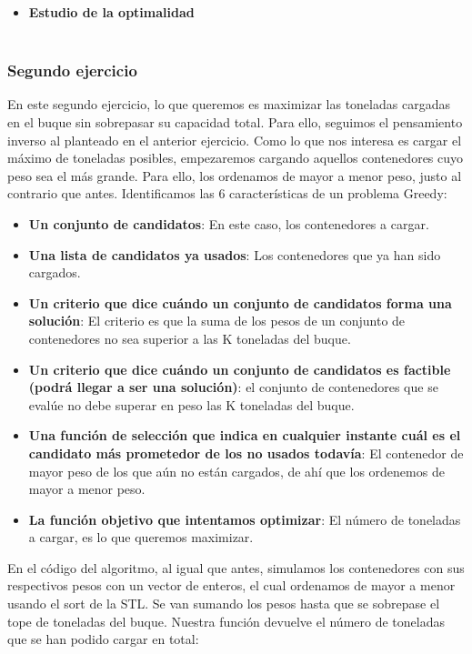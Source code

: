 \documentclass[10pt,a4paper]{article}
\begin{document}
	
	
	\begin{itemize}
		\item \textbf{Estudio de la optimalidad}
		\\
		\\
	\end{itemize}
	
\subsubsection{Segundo ejercicio}

	En este segundo ejercicio, lo que queremos es maximizar las toneladas cargadas en el buque sin sobrepasar su capacidad total. Para ello, seguimos el pensamiento inverso al planteado en el anterior ejercicio. Como lo que nos interesa es cargar el máximo de toneladas posibles, empezaremos cargando aquellos contenedores cuyo peso sea el más grande. Para ello, los ordenamos de mayor a menor peso, justo al contrario que antes. Identificamos las 6 características de un problema Greedy:
	
	\begin{itemize}
		\item \textbf{Un conjunto de candidatos}: En este caso, los contenedores a cargar.
		\item \textbf{Una lista de candidatos ya usados}: Los contenedores que ya han sido cargados.
		\item \textbf{Un criterio que dice cuándo un conjunto de candidatos forma una solución}: El criterio es que la suma de los pesos de un conjunto de contenedores no sea superior a las K toneladas del buque.
		\item \textbf{Un criterio que dice cuándo un conjunto de candidatos es factible (podrá llegar a ser una solución)}: el conjunto de contenedores que se evalúe no debe superar en peso las K toneladas del buque.
		\item \textbf{Una función de selección que indica en cualquier instante cuál es el candidato más prometedor de los no usados todavía}: El contenedor de mayor peso de los que aún no están cargados, de ahí que los ordenemos de mayor a menor peso.
		\item \textbf{La función objetivo que intentamos optimizar}: El número de toneladas a cargar, es lo que queremos maximizar.
	\end{itemize}

	En el código del algoritmo, al igual que antes, simulamos los contenedores con sus respectivos pesos con un vector de enteros, el cual ordenamos de mayor a menor usando el sort de la STL. Se van sumando los pesos hasta que se sobrepase el tope de toneladas del buque. Nuestra función devuelve el número de toneladas que se han podido cargar en total:
	
\end{document}
